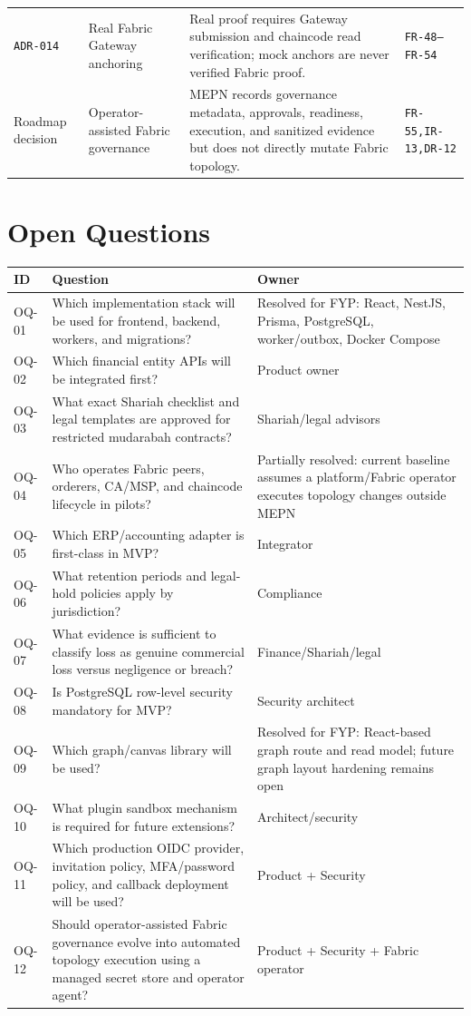 \documentclass[11pt,a4paper]{article}
\newcommand{\req}[1]{\texttt{#1}}
\newcommand{\adr}[1]{\texttt{ADR-#1}}
\begin{document}
\begin{longtable}{L{23mm}L{34mm}L{48mm}L{42mm}}
\adr{014} & Real Fabric Gateway anchoring & Real proof requires Gateway submission and chaincode read verification; mock anchors are never verified Fabric proof. & \req{FR-48--FR-54} \\
Roadmap decision & Operator-assisted Fabric governance & MEPN records governance metadata, approvals, readiness, execution, and sanitized evidence but does not directly mutate Fabric topology. & \req{FR-55,IR-13,DR-12} \\
\bottomrule
\end{longtable}

\section{Open Questions}
\begin{longtable}{L{22mm}L{88mm}L{32mm}}
\toprule
\textbf{ID} & \textbf{Question} & \textbf{Owner} \\
\midrule
OQ-01 & Which implementation stack will be used for frontend, backend, workers, and migrations? & Resolved for FYP: React, NestJS, Prisma, PostgreSQL, worker/outbox, Docker Compose \\
OQ-02 & Which financial entity APIs will be integrated first? & Product owner \\
OQ-03 & What exact Shariah checklist and legal templates are approved for restricted mudarabah contracts? & Shariah/legal advisors \\
OQ-04 & Who operates Fabric peers, orderers, CA/MSP, and chaincode lifecycle in pilots? & Partially resolved: current baseline assumes a platform/Fabric operator executes topology changes outside MEPN \\
OQ-05 & Which ERP/accounting adapter is first-class in MVP? & Integrator \\
OQ-06 & What retention periods and legal-hold policies apply by jurisdiction? & Compliance \\
OQ-07 & What evidence is sufficient to classify loss as genuine commercial loss versus negligence or breach? & Finance/Shariah/legal \\
OQ-08 & Is PostgreSQL row-level security mandatory for MVP? & Security architect \\
OQ-09 & Which graph/canvas library will be used? & Resolved for FYP: React-based graph route and read model; future graph layout hardening remains open \\
OQ-10 & What plugin sandbox mechanism is required for future extensions? & Architect/security \\
OQ-11 & Which production OIDC provider, invitation policy, MFA/password policy, and callback deployment will be used? & Product + Security \\
OQ-12 & Should operator-assisted Fabric governance evolve into automated topology execution using a managed secret store and operator agent? & Product + Security + Fabric operator \\
\bottomrule
\end{longtable}
\end{document}
